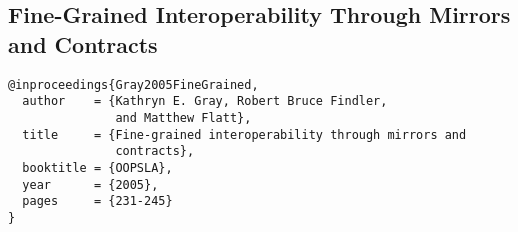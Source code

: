 \documentclass[letterpaper]{llncs}
\begin{document}
%
%
%
%




\subsection*{Fine-Grained Interoperability Through Mirrors and Contracts}%

\begin{verbatim}
@inproceedings{Gray2005FineGrained,
  author    = {Kathryn E. Gray, Robert Bruce Findler, 
               and Matthew Flatt},
  title     = {Fine-grained interoperability through mirrors and 
               contracts},
  booktitle = {OOPSLA},
  year      = {2005},
  pages     = {231-245}
}
\end{verbatim}

\end{document}
